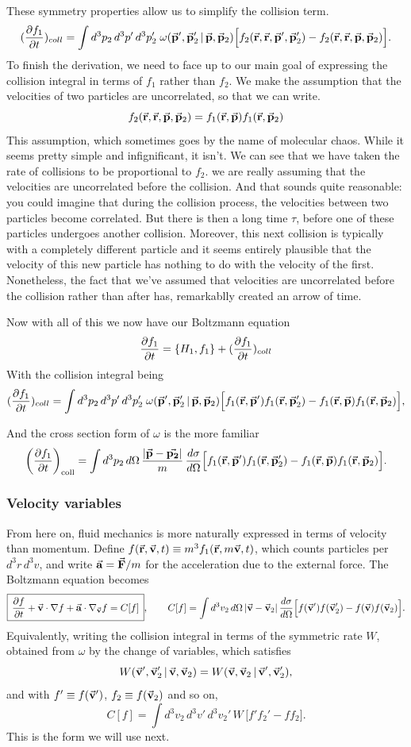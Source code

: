   These symmetry properties allow us to simplify the collision term.
\[
(\pdv{f_1}{t})_{coll} = \int d^3p_2\,d^3p'\,d^3p_2'\;\omega(\va p',\va p_2'\,|\,\va p,\va p_2)\Big[f_2(\va r,\va r,\va p',\va p_2') - f_2(\va r,\va r,\va p,\va p_2)\Big].
  \]
  To finish the derivation, we need to face up to our main goal of expressing the collision integral in terms of $f_1$ rather than $f_2$. We make the assumption that the velocities of two particles are uncorrelated, so that we can write.
\[
f_2(\va{r}, \va{r}, \va{p}, \va{p}_2) = f_1(\va{r}, \va{p})f_1(\va{r}, \va{p}_2)
  \]
This assumption, which sometimes goes by the name of molecular chaos. While it seems pretty simple and infignificant, it isn't. We can see that we have taken the
rate of collisions to be proportional to $f_2$. we are really assuming that the velocities are uncorrelated before the collision. And that sounds quite reasonable: you could imagine that during the collision process, the velocities between two particles become correlated. But there is then a long time $\tau$, before one of these particles undergoes another collision. Moreover, this next collision is typically with a completely different particle and it seems entirely plausible that the velocity of this new particle has nothing to do with the velocity of the first. Nonetheless, the fact that we’ve assumed that velocities are uncorrelated before the collision rather than after has, remarkablly created an arrow of time.

Now with all of this we now have our Boltzmann equation
\[
\pdv{f_1}{t} = \pb{H_1}{f_1} + (\pdv{f_1}{t})_{coll}
  \]
  With the collision integral being
\[
(\pdv{f_1}{t})_{coll} = \int d^3p_2\,d^3p'\,d^3p_2'\;\omega(\va p',\va p_2'\,|\,\va p,\va p_2)\Big[f_1(\va r,\va p')f_1(\va r,\va p_2') - f_1(\va r,\va p)f_1(\va r,\va p_2)\Big],
  \]

  And the cross section form of $\omega$ is the more familiar
\[
\left(\pdv{f_1}{t}\right)_{\mathrm{coll}} = \int d^3p_2\,d\Omega \, \frac{|\va p-\va{p_2}|}{m}\,\frac{d\sigma}{d\Omega}\Big[f_1(\va r,\va p')f_1(\va r,\va p_2') - f_1(\va r,\va p)f_1(\va r,\va p_2)\Big].
  \]


\subsubsection*{Velocity variables}

From here on, fluid mechanics is more naturally expressed in terms of velocity than momentum. Define $f(\va r,\va v,t)\equiv m^3 f_1(\va r,m\va v,t)$, which counts particles per $d^3r\,d^3v$, and write $\va a=\va F/m$ for the acceleration due to the external force. The Boltzmann equation becomes
\[
\boxed{\, \pdv{f}{t} + \va v\cdot\nabla f + \va a\cdot\nabla_{\va v}f = C[f]\, },\qquad
C[f] = \int d^3v_2\,d\Omega\, |\va v-\va v_2|\,\frac{d\sigma}{d\Omega}\Big[f(\va v')f(\va v_2') - f(\va v)f(\va v_2)\Big].
\]
Equivalently, writing the collision integral in terms of the symmetric rate $W$, obtained from $\omega$ by the change of variables, which satisfies
\[
W(\va v',\va v_2'\,|\,\va v,\va v_2)=W(\va v,\va v_2\,|\,\va v',\va v_2'),
\]
and with $f'\equiv f(\va v')$, $f_2\equiv f(\va v_2)$ and so on,
\[
C[f]=\int d^3v_2\,d^3v'\,d^3v_2'\, W\,\big[f'f_2'-ff_2\big].
\]
This is the form we will use next.

